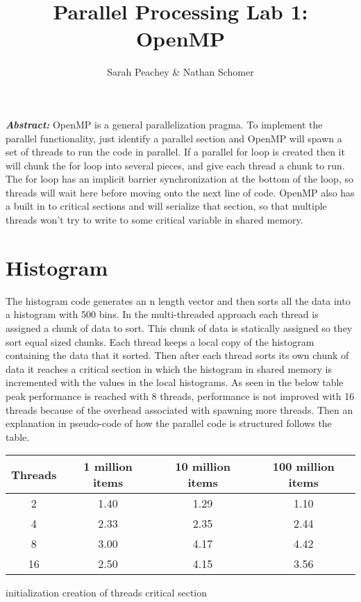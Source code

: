 \documentclass[12pt]{article}
\begin{document}
\title{Parallel Processing Lab 1: OpenMP}
\author{Sarah Peachey \& Nathan Schomer}
\maketitle

\textbf{\textit{Abstract:}} OpenMP is a general parallelization pragma. To
implement the parallel functionality, just identify a parallel section and
OpenMP will spawn a set of threads to run the code in parallel. If a
parallel for loop is created then it will chunk the for loop into several
pieces, and give each thread a chunk to run. The for loop has an implicit
barrier synchronization at the bottom of the loop, so threads will wait here
before moving onto the next line of code. OpenMP also has a built in to
critical sections and will serialize that section, so that multiple threads
won't try to write to some critical variable in shared memory. 

\newpage

\section{Histogram\label{histo}}
\qquad The histogram code generates an n length vector and then sorts all
the data into a histogram with 500 bins. In the multi-threaded approach each
thread is assigned a chunk of data to sort. This chunk of data is statically
assigned so they sort equal sized chunks. Each thread keeps a local copy of
the histogram containing the data that it sorted. Then after each thread
sorts its own chunk of data it reaches a critical section in which the
histogram in shared memory is incremented with the values in the local
histograms. As seen in the below table peak performance is reached with 8
threads, performance is not improved with 16 threads because of the overhead
associated with spawning more threads. Then an explanation in pseudo-code of
how the parallel code is structured follows the table.  

\begin{center}
\hspace*{-2.5cm}
\begin{tabular}{@{}|c|c|c|c|}
\hline
Threads & 1 million items & 10 million items & 100 million items \\
\hline 
2 & 1.40 & 1.29 & 1.10 \\
\hline
4 & 2.33 & 2.35 & 2.44 \\
\hline
8 & 3.00 & 4.17 & 4.42 \\
\hline 
16 & 2.50 & 4.15 & 3.56 \\
\hline 
\end{tabular}
\hspace*{-2.5cm}
\end{center}

\begin{algorithm}[H]
\SetAlgoLined
{}
initialization\;
creation of threads\; 
critical section\; 
\end{algorithm}
\end{document}
